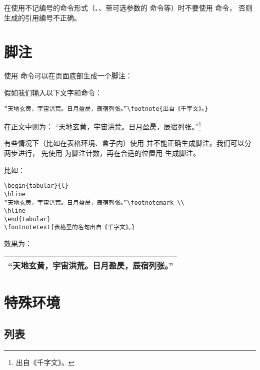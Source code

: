 在使用不记编号的命令形式（、、带可选参数的  命令等）时不要使用  命令，
否则生成的引用编号不正确。

\section{脚注}\label{sec:footnote}

使用  命令可以在页面底部生成一个脚注：
\begin{command}
\end{command}

假如我们输入以下文字和命令：
\begin{verbatim}
“天地玄黄，宇宙洪荒。日月盈昃，辰宿列张。”\footnote{出自《千字文》。}
\end{verbatim}

在正文中则为：%
“天地玄黄，宇宙洪荒。日月盈昃，辰宿列张。”\footnote{出自《千字文》。}

有些情况下（比如在表格环境、盒子内）使用  并不能正确生成脚注。我们可以分两步进行，
先使用  为脚注计数，再在合适的位置用  生成脚注。

比如：
\begin{verbatim}
\begin{tabular}{l}
\hline
“天地玄黄，宇宙洪荒。日月盈昃，辰宿列张。”\footnotemark \\
\hline
\end{tabular}
\footnotetext{表格里的名句出自《千字文》。}
\end{verbatim}

效果为：

\leavevmode\begin{tabular}{l}
\hline
“天地玄黄，宇宙洪荒。日月盈昃，辰宿列张。”\footnotemark \\
\hline
\end{tabular}

\section{特殊环境}\label{sec:envs}

\subsection{列表}\label{subsec:lists}

